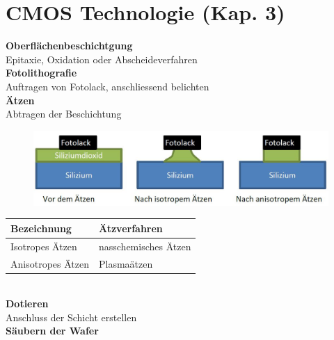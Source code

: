 
\section{CMOS Technologie (Kap. 3)}

\begin{minipage}[t]{0.5\textwidth}
	\textbf{Oberflächenbeschichtgung}\\
	Epitaxie, Oxidation oder Abscheideverfahren\\ [2ex]
	\textbf{Fotolithografie}\\
	Auftragen von Fotolack, anschliessend belichten\\ [2ex]
	\textbf{Ätzen}\\
	Abtragen der Beschichtung
	\begin{figure}[H]
		\includegraphics[width=0.8\linewidth]{chapters/Technologie/images/Aetzen}
	\end{figure}
	\begin{tabular}{|l|l|}
		\hline
		\textbf{Bezeichnung}&\textbf{Ätzverfahren}\\ \hline
		Isotropes Ätzen&nasschemisches Ätzen\\ \hline
		Anisotropes Ätzen&Plasmaätzen\\ \hline
	\end{tabular}\\ [2ex]
	\textbf{Dotieren}\\
	Anschluss der Schicht erstellen\\ [2ex]
	\textbf{Säubern der Wafer}\\
\end{minipage}
